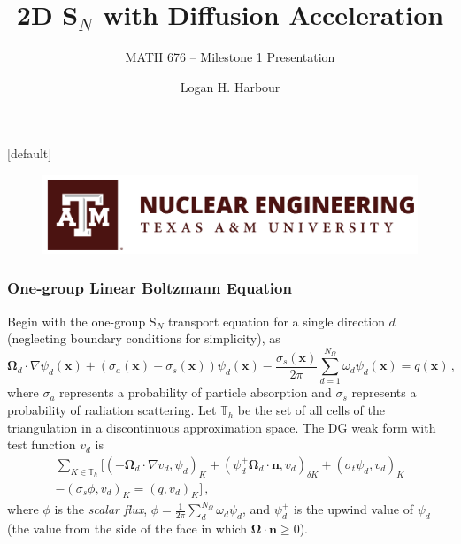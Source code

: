 \documentclass[xcolor={usenames,dvipsnames,svgnames,table}]{beamer}
\title[2D S$_N$ with Diffusion Acceleration]{2D S$_N$ with Diffusion Acceleration}
\subtitle{MATH 676 -- Milestone 1 Presentation}
\author[L. Harbour]{Logan H. Harbour}
\institute[]{Department of Nuclear Engineering \\ Texas A\&M University}
\date[March 20, 2019]
\newcommand{\vx}{\mathbf{x}} %
\newcommand{\vo}{\pmb{\Omega}} %
\newcommand{\vn}{\mathbf{n}} %
\newcommand{\pinp}[2]{\left(#1,#2\right)}
\begin{document}
{
[default] 
\begin{frame}
\vfill
\titlepage
\vfill
\begin{figure}[t]
	\centering
	\includegraphics[width=.5\textwidth]{images/nuen}
\end{figure}
\vfill
\end{frame}
}


\begin{frame}\frametitle{One-group Linear Boltzmann Equation}
	Begin with the one-group S$_N$ transport equation for a single direction $d$ (neglecting boundary conditions for simplicity), as	
	\begin{equation}
		\label{eq:boltzmann}
		\vo_d \cdot \nabla \psi_d(\vx) + \left(\sigma_a(\vx) + \sigma_s(\vx)\right) \psi_d(\vx) - \frac{\sigma_s(\vx)}{2\pi} \sum_{d = 1}^{N_\Omega} \omega_d \psi_d(\vx) = q(\vx)\,,
	\end{equation}
	where $\sigma_a$ represents a probability of particle absorption and $\sigma_s$ represents a probability of radiation scattering. Let $\mathbb{T}_h$ be the set of all cells of the triangulation in a discontinuous approximation space. The DG weak form with test function $v_d$ is
	\begin{multline}
		\sum_{K \in \mathbb{T}_h} \Big[ \pinp{-\vo_d \cdot \nabla v_d}{\psi_d}_K + \pinp{\psi_d^+ \vo_d \cdot \vn}{v_d}_{\delta K} + \pinp{\sigma_t \psi_d}{v_d}_K  \\ - \pinp{\sigma_s \phi}{v_d}_K = \pinp{q}{v_d}_K\Big]\,,
	\end{multline}
	where $\phi$ is the \textit{scalar flux}, $\phi = \frac{1}{2\pi} \sum_d^{N_\Omega} \omega_d \psi_d$, and $\psi_d^+$ is the upwind value of $\psi_d$ (the value from the side of the face in which $\vo \cdot \vn \geq 0$).
\end{frame}

\end{document}
